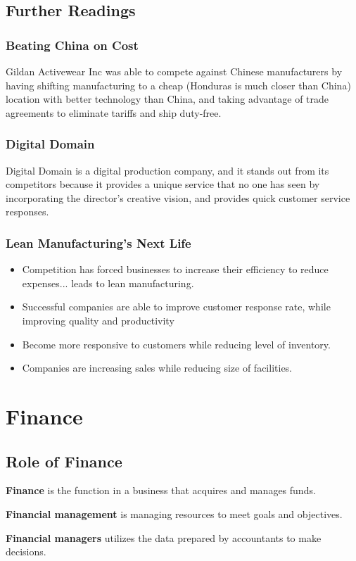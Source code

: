 \documentclass[english, 12pt]{article}
\begin{document}
\subsection*{Further Readings}
\subsubsection*{Beating China on Cost}
Gildan Activewear Inc was able to compete against Chinese manufacturers by having shifting manufacturing to a cheap (Honduras is much closer than China) location with better technology than China, and taking advantage of trade agreements to eliminate tariffs and ship duty-free.
\subsubsection*{Digital Domain}
Digital Domain is a digital production company, and it stands out from its competitors because it provides a unique service that no one has seen by incorporating the director's creative vision, and  provides quick customer service responses.
\subsubsection*{Lean Manufacturing's Next Life}
\begin{itemize}
\item Competition has forced businesses to increase their efficiency to reduce expenses... leads to lean manufacturing.
\item Successful companies are able to improve customer response rate, while improving quality and productivity
\item Become more responsive to customers while reducing level of inventory.
\item Companies are increasing sales while reducing size of facilities.
\end{itemize}
\section{Finance}
\subsection{Role of Finance}
\begin{defn}
\textbf{Finance} is the function in a business that acquires and manages funds.
\end{defn}
\begin{defn}
\textbf{Financial management} is managing resources to meet goals and objectives.
\end{defn}
\begin{defn}
\textbf{Financial managers} utilizes the data prepared by accountants to make decisions.
\end{defn}
\end{document}
